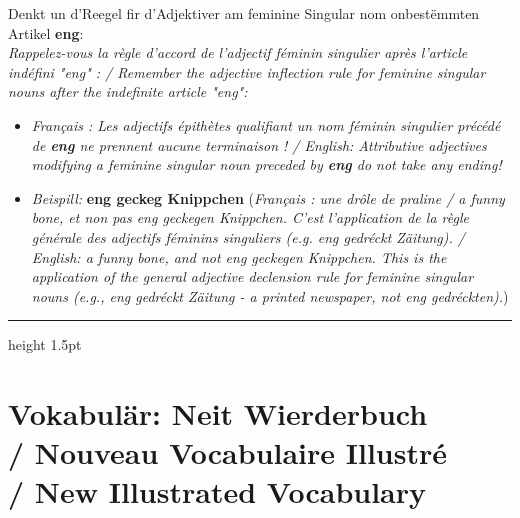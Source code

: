 Denkt un d'Reegel fir d'Adjektiver am feminine Singular nom onbestëmmten Artikel \textbf{eng}: \\
\textit{Rappelez-vous la règle d'accord de l'adjectif féminin singulier après l'article indéfini "eng" : / Remember the adjective inflection rule for feminine singular nouns after the indefinite article "eng":}
\begin{itemize}
    \item \textit{Français : Les adjectifs épithètes qualifiant un nom féminin singulier précédé de \textbf{eng} ne prennent aucune terminaison ! / English: Attributive adjectives modifying a feminine singular noun preceded by \textbf{eng} do not take any ending!}
    \item \textit{Beispill:} \textbf{eng geckeg Knippchen} (\textit{Français : une drôle de praline / a funny bone, et non pas \textit{eng geckegen Knippchen}. C'est l'application de la règle générale des adjectifs féminins singuliers (e.g. \textit{eng gedréckt Zäitung}). / English: a funny bone, and not \textit{eng geckegen Knippchen}. This is the application of the general adjective declension rule for feminine singular nouns (e.g., \textit{eng gedréckt Zäitung} - a printed newspaper, not \textit{eng gedréckten}).})
\end{itemize}

\vspace{1.5cm}
\color{geminiBlue}\hrule height 1.5pt \vspace{0.5em}\color{black}

\section[Vokabulär: Neit Wierderbuch]{Vokabulär: Neit Wierderbuch \\/ Nouveau Vocabulaire Illustré \\/ New Illustrated Vocabulary}

